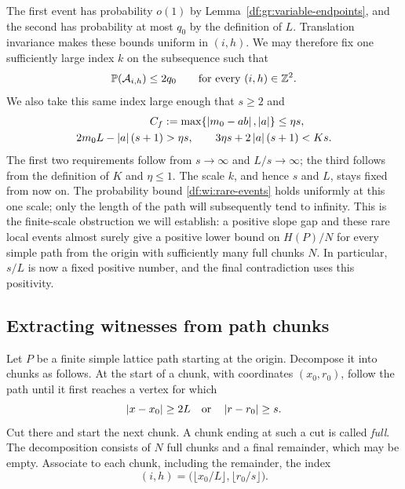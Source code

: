 The first event has probability $o(1)$ by
Lemma~\ref{df:gr:variable-endpoints}, and the second has probability at most
$q_0$ by the definition of $L$.  Translation invariance makes these bounds
uniform in $(i,h)$.  We may therefore fix one sufficiently large index $k$
on the subsequence such that
\begin{equation}
\label{df:wi:rare-events}
  \mathbb P(\mathcal A_{i,h})\le2q_0
  \qquad\text{for every }(i,h)\in\mathbb Z^2.
\end{equation}
We also take this same index large enough that $s\ge2$ and
\begin{align}
\label{df:wi:deterministic-scale}
  C_f&:=\max\{\left\lvert m_0-ab\right\rvert,\left\lvert a\right\rvert\}\le\eta s,\\
  2m_0L-\left\lvert a\right\rvert(s+1)&>\eta s,
  \qquad
  3\eta s+2\left\lvert a\right\rvert(s+1)<Ks.
  \nonumber
\end{align}
The first two requirements follow from $s\to\infty$ and $L/s\to\infty$;
the third follows from the definition of $K$ and $\eta\le1$.
The scale $k$, and hence $s$ and $L$, stays fixed from now on. The
probability bound \eqref{df:wi:rare-events} holds uniformly at this one
scale; only the length of the path will subsequently tend to infinity.
This is the finite-scale obstruction we will establish: a positive slope
gap and these rare local events almost surely give a positive lower bound
on $H(P)/N$ for every simple path from the origin with sufficiently many
full chunks $N$. In particular, $s/L$ is now a fixed positive number, and
the final contradiction uses this positivity.

\subsection{Extracting witnesses from path chunks}

Let $P$ be a finite simple lattice path starting at the origin.  Decompose
it into chunks as follows.  At the start of a chunk, with coordinates
$(x_0,r_0)$, follow the path until it first reaches a vertex for which
\[
  \left\lvert x-x_0\right\rvert\ge2L
  \quad\text{or}\quad
  \left\lvert r-r_0\right\rvert\ge s.
\]
Cut there and start the next chunk.  A chunk ending at such a cut is called
\emph{full}.  The decomposition consists of $N$ full chunks and a final
remainder, which may be empty.  Associate to each chunk, including the
remainder, the index
\begin{equation}
\label{df:wi:chunk-index}
  (i,h)=\bigl(\lfloor x_0/L\rfloor,\lfloor r_0/s\rfloor\bigr).
\end{equation}

